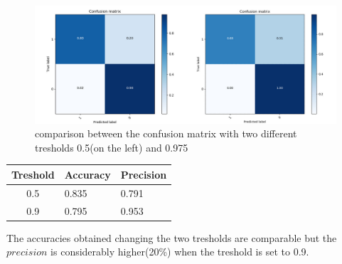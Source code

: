 \begin{figure}
\begin{center}
\includegraphics[width=1\linewidth]{images/FINAL_MERGED.jpg}
\end{center}
   \caption{comparison between the confusion matrix with two different tresholds 0.5(on the left) and 0.975}
\label{fig:conf_matrices}
\end{figure}

\begin{table}[]
\centering
\begin{tabular}{|c|ll|}
\hline
Treshold & Accuracy & Precision \\ \hline
0.5                          & 0.835    & 0.791     \\ \hline
0.9                          & 0.795    & 0.953     \\ \hline
\end{tabular}
\end{table}


The accuracies obtained changing the two tresholds are comparable but the $precision$ is considerably higher(20\%) when the treshold is set to 0.9.



